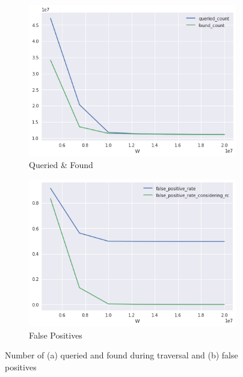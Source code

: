 \begin{figure}[htbp]
	\centering
    \begin{subfigure}{.5\textwidth}
        \centering
        \includegraphics[width=\textwidth]{figures/e_coli-queried_and_found-K31-D8-T40}
        \caption{Queried \& Found}\label{subfig:ecoli-queriedandfound}
    \end{subfigure}%
    \begin{subfigure}{.5\textwidth}
        \centering
        \includegraphics[width=\textwidth]{figures/e_coli-false_positive_rates-K31-D8-T40}
        \caption{False Positives}\label{subfig:ecoli-falsepositives}
    \end{subfigure}
	\caption{Number of (a)  queried and found during traversal and (b) false positives}\label{fig:ecoli-exact-frequencies}
\end{figure}